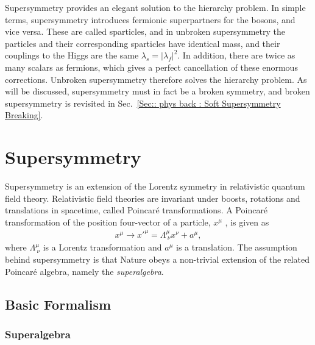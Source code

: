 \documentclass[twoside,english]{uiofysmaster}
\begin{document}
Supersymmetry provides an elegant solution to the hierarchy problem. In simple terms, supersymmetry introduces fermionic superpartners for the bosons, and vice versa. These are called sparticles, and in unbroken supersymmetry the particles and their corresponding sparticles have identical mass, and their couplings to the Higgs are the same $\lambda_s = |\lambda_f|^2$. In addition, there are twice as many scalars as fermions, which gives a perfect cancellation of these enormous corrections. Unbroken supersymmetry therefore solves the hierarchy problem. As will be discussed, supersymmetry must in fact be a broken symmetry, and broken supersymmetry is revisited in Sec.~\ref{Sec:: phys back : Soft Supersymmetry Breaking}.


\section{Supersymmetry}

Supersymmetry is an extension of the Lorentz symmetry in relativistic quantum field theory. Relativistic field theories are invariant under boosts, rotations and translations in spacetime, called Poincar\'{e} transformations. A Poincar\'{e} transformation of the position four-vector of a particle, $x^{\mu}$ , is given as
\begin{align}
x^{\mu} \rightarrow x'^{\mu} = \Lambda^{\mu}_{\ \nu} x^{\nu} + a^{\mu}, 
\end{align}
where $\Lambda^{\mu}_{\ \nu}$  is a Lorentz transformation and $a^{\mu}$ is a translation. The assumption behind supersymmetry is that Nature obeys a non-trivial extension of the related Poincar\'{e} algebra, namely the \textit{superalgebra}. 

\subsection{Basic Formalism}

\subsubsection{Superalgebra}
\end{document}
